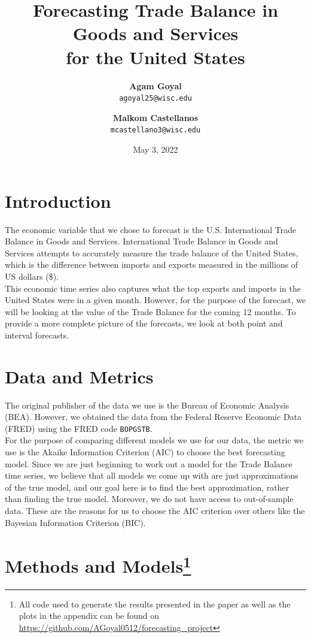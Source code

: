 \documentclass[12pt]{article}
\title{\vspace{-3cm}Forecasting Trade Balance in Goods and Services\\ for the United States}
\author{
  \textbf{Agam Goyal}\\
  \texttt{agoyal25@wisc.edu}
  \and
  \textbf{Malkom Castellanos}\\
  \texttt{mcastellano3@wisc.edu}
}
\date{May 3, 2022}
\begin{document}
\maketitle

\section{Introduction}

The economic variable that we chose to forecast is the U.S. International Trade Balance in Goods and Services. International Trade Balance in Goods and Services attempts to accurately measure the trade balance of the United States, which is the difference between imports and exports measured in the millions of US dollars (\$).\\

This economic time series also captures what the top exports and imports in the United States were in a given month. However, for the purpose of the forecast, we will be looking at the value of the Trade Balance for the coming 12 months. To provide a more complete picture of the forecasts, we look at both point and interval forecasts.

\section{Data and Metrics}

The original publisher of the data we use is the Bureau of Economic Analysis (BEA). However, we obtained the data from the Federal Reserve Economic Data (FRED)\cite{data} using the FRED code \texttt{BOPGSTB}.\\

For the purpose of comparing different models we use for our data, the metric we use is the Akaike Information Criterion (AIC) to choose the best forecasting model. Since we are just beginning to work out a model for the Trade Balance time series, we believe that all models we come up with are just approximations of the true model, and our goal here is to find the best approximation, rather than finding the true model\cite{aic}. Moreover, we do not have access to out-of-sample data. These are the reasons for us to choose the AIC criterion over others like the Bayesian Information Criterion (BIC).

\section{Methods and Models\footnote{All code used to generate the results presented in the paper as well as the plots in the appendix can be found on \url{https://github.com/AGoyal0512/forecasting_project}}}
\end{document}
